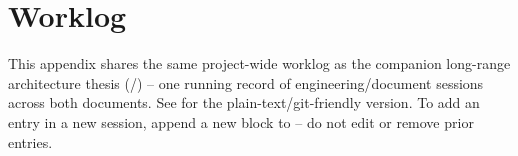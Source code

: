 \clearpage
\appendix
\section{Worklog}
\label{sec:worklog}

\small
This appendix shares the same project-wide worklog as the companion long-range architecture thesis (/) -- one running record of engineering/document sessions across both documents. See  for the plain-text/git-friendly version. To add an entry in a new session, append a new  block to  -- do not edit or remove prior entries.
\normalsize


